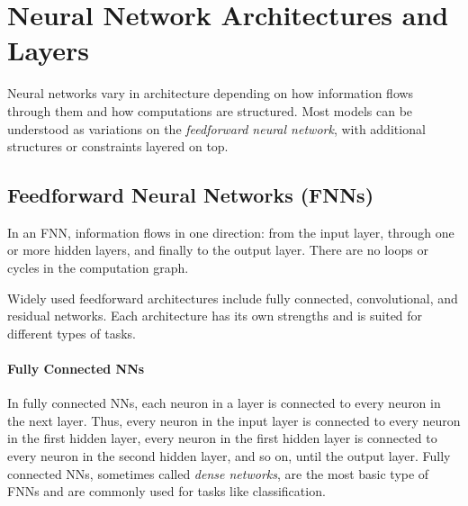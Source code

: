 \documentclass[oneside,11pt,dvipsnames]{book}
\numberwithin{equation}{section}
\theoremstyle{definition}
\theoremstyle{remark}
\begin{document}
\section{Neural Network Architectures and Layers}

Neural networks vary in architecture depending on how information flows through them and how computations are structured. Most models can be understood as variations on the \emph{feedforward neural network}, with additional structures or constraints layered on top. 





\subsection{Feedforward Neural Networks (FNNs)}\label{sec:ffn}

In an FNN, information flows in one direction: from the input layer, through one or more hidden layers, and finally to the output layer. There are no loops or cycles in the computation graph. 

Widely used feedforward architectures include fully connected, convolutional, and residual networks. Each architecture has its own strengths and is suited for different types of tasks.

\paragraph{Fully Connected NNs}

In fully connected NNs, each neuron in a layer is connected to every neuron in the next layer. Thus, every neuron in the input layer is connected to every neuron in the first hidden layer, every neuron in the first hidden layer is connected to every neuron in the second hidden layer, and so on, until the output layer. Fully connected NNs, sometimes called \emph{dense networks}, are the most basic type of FNNs and are commonly used for tasks like classification. 
\end{document}
